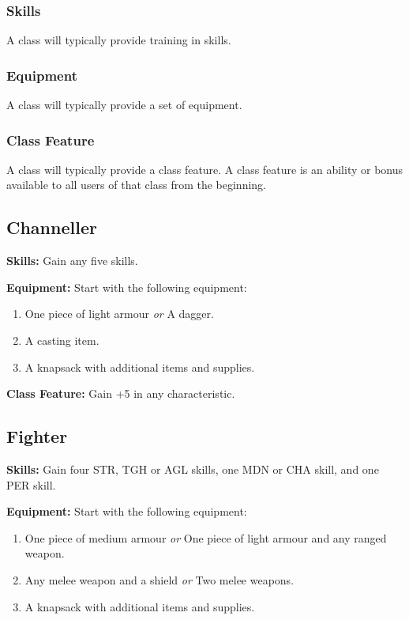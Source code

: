 \documentclass[]{article}
\providecommand{\tightlist}{%
  \setlength{\itemsep}{0pt}\setlength{\parskip}{0pt}}
\begin{document}
\subsubsection{Skills}\label{skills}

A class will typically provide training in skills.

\subsubsection{Equipment}\label{equipment}

A class will typically provide a set of equipment.

\subsubsection{Class Feature}\label{class-feature}

A class will typically provide a class feature. A class feature is an
ability or bonus available to all users of that class from the
beginning.

\subsection{Channeller}\label{channeller}

\textbf{Skills:} Gain any five skills.

\textbf{Equipment:} Start with the following equipment:

\begin{enumerate}
\def\labelenumi{\arabic{enumi}.}
\tightlist
\item
  One piece of light armour \emph{or} A dagger.
\item
  A casting item.
\item
  A knapsack with additional items and supplies.
\end{enumerate}

\textbf{Class Feature:} Gain +5 in any characteristic.

\subsection{Fighter}\label{fighter}

\textbf{Skills:} Gain four STR, TGH or AGL skills, one MDN or CHA skill,
and one PER skill.

\textbf{Equipment:} Start with the following equipment:

\begin{enumerate}
\def\labelenumi{\arabic{enumi}.}
\tightlist
\item
  One piece of medium armour \emph{or} One piece of light armour and any
  ranged weapon.
\item
  Any melee weapon and a shield \emph{or} Two melee weapons.
\item
  A knapsack with additional items and supplies.
\end{enumerate}
\end{document}
